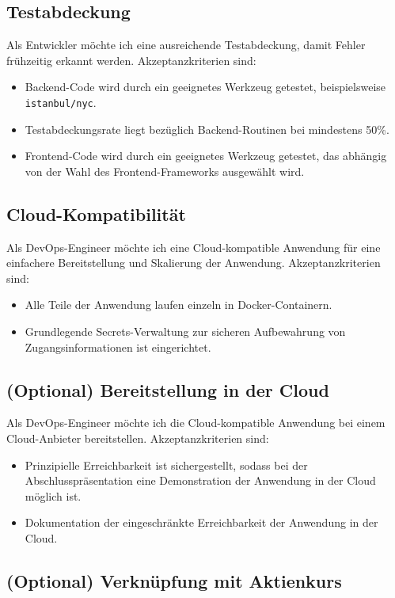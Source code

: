 \documentclass[a4paper, 10pt, conference]{IEEEtran}
\begin{document}
\subsection{Testabdeckung}

Als Entwickler möchte ich eine ausreichende Testabdeckung, damit Fehler frühzeitig erkannt werden.  Akzeptanzkriterien sind:
\begin{itemize}
\item Backend-Code wird durch ein geeignetes Werkzeug getestet, beispielsweise \texttt{istanbul/nyc}.
\item Testabdeckungsrate liegt bezüglich Backend-Routinen bei mindestens 50\%.
\item Frontend-Code wird durch ein geeignetes Werkzeug getestet, das abhängig von der Wahl des Frontend-Frameworks ausgewählt wird.
\end{itemize}

\subsection{Cloud-Kompatibilität}

Als DevOps-Engineer möchte ich eine Cloud-kompatible Anwendung für eine einfachere Bereitstellung und Skalierung der Anwendung. Akzeptanzkriterien sind:
\begin{itemize}
\item Alle Teile der Anwendung laufen einzeln in Docker-Containern.
\item Grundlegende Secrets-Verwaltung zur sicheren Aufbewahrung von Zugangsinformationen ist eingerichtet.
\end{itemize}

\subsection{(Optional) Bereitstellung in der Cloud}

Als DevOps-Engineer möchte ich die Cloud-kompatible Anwendung bei einem Cloud-Anbieter bereitstellen.  Akzeptanzkriterien sind:
\begin{itemize}
\item Prinzipielle Erreichbarkeit ist sichergestellt, sodass bei der Abschlusspräsentation eine Demonstration der Anwendung in der Cloud möglich ist.
\item Dokumentation der eingeschränkte Erreichbarkeit der Anwendung in der Cloud.
\end{itemize}

\subsection{(Optional) Verknüpfung mit Aktienkurs}
\end{document}
